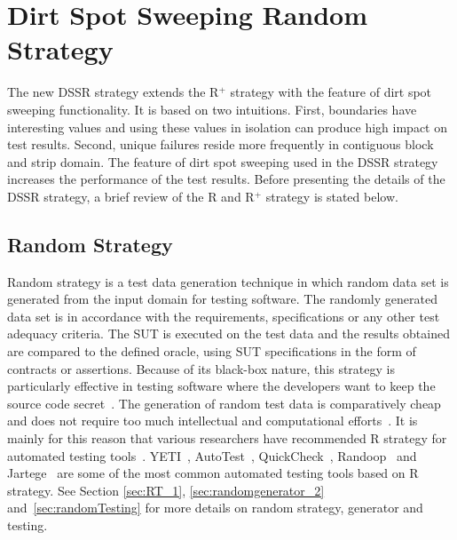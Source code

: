 
\section{Dirt Spot Sweeping Random Strategy}\label{sec:dssr}
The new DSSR strategy extends the R$^+$ strategy with the feature of dirt spot sweeping functionality. It is based on two intuitions. First, boundaries have interesting values and using these values in isolation can produce high impact on test results. Second, unique failures reside more frequently in contiguous block and strip domain. The feature of dirt spot sweeping used in the DSSR strategy increases the performance of the test results. Before presenting the details of the DSSR strategy, a brief review of the R and R$^+$ strategy is stated below.

\subsection{Random Strategy}
Random strategy is a test data generation technique in which random data set is generated from the input domain for testing software. The randomly generated data set is in accordance with the requirements, specifications or any other test adequacy criteria. The SUT is executed on the test data and the results obtained are compared to the defined oracle, using SUT specifications in the form of contracts or assertions. Because of its black-box nature, this strategy is particularly effective in testing software where the developers want to keep the source code secret~\cite{chen2010adaptive}. The generation of random test data is comparatively cheap and does not require too much intellectual and computational efforts~\cite{ciupa2008finding, ciupa2011number}. It is mainly for this reason that various researchers have recommended R strategy for automated testing tools~\cite{ciupa2008artoo}.
 YETI~\cite{oriol2010yeti, oriol2012random}, AutoTest~\cite{leitner2007reconciling, ciupa2007experimental}, QuickCheck~\cite{claessen2011quickcheck}, Randoop~\cite{pacheco2007randoop, pacheco2007feedback} and Jartege~\cite{oriat2005jartege} are some of the most common automated testing tools based on R strategy. See Section \ref{sec:RT_1}, \ref{sec:randomgenerator_2} and~\ref{sec:randomTesting} for more details on random strategy, generator and testing.


